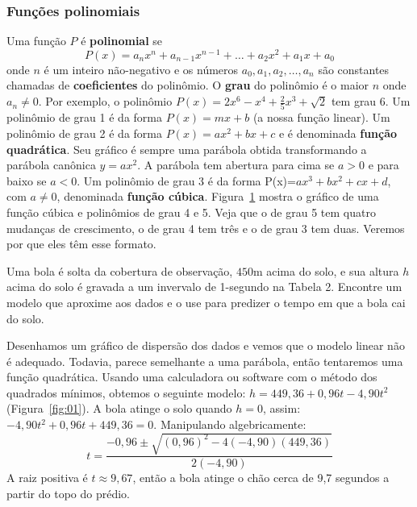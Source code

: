 \subsubsection{Funções polinomiais}
Uma função $P$ é \textbf{polinomial} se $$P(x)=a_nx^n+a_{n-1}x^{n-1}+\dots+a_2x^2+a_1x+a_0$$
onde $n$ é um inteiro não-negativo e os números $a_0,a_1,a_2,\dots,a_n$ são constantes chamadas de \textbf{coeficientes} do polinômio. O \textbf{grau} do polinômio é o maior $n$ onde $a_n\neq 0$. Por exemplo, o polinômio $P(x)=2x^6-x^4+\frac{2}{5}x^3+\sqrt{2}$ tem grau 6. Um polinômio de grau 1 é da forma $P(x)=mx+b$ (a nossa função linear). Um polinômio de grau 2 é da forma $P(x)=ax^2+bx+c$ e é denominada \textbf{função quadrática}. Seu gráfico é sempre uma parábola obtida transformando a parábola canônica $y=ax^2$. A parábola tem abertura para cima se $a>0$ e para baixo se $a<0$. Um polinômio de grau 3 é da forma P(x)=$ax^3+bx^2+cx+d$, com $a\neq 0$, denominada \textbf{função cúbica}. Figura~\ref{fig:polinomiais} mostra o gráfico de uma função cúbica e polinômios de grau 4 e 5. Veja que o de grau 5 tem quatro mudanças de crescimento, o de grau 4 tem três e o de grau 3 tem duas. Veremos por que eles têm esse formato.
\vspace{-0.5cm}\begin{figure}[!ht]
  \centering
  \caption{}\label{fig:polinomiais}
\end{figure}\vspace{-0.5cm}

 Uma bola é solta da cobertura de observação, $450\si\meter$ acima do solo, e sua altura $h$ acima do solo é gravada a um invervalo de 1-segundo na Tabela 2. Encontre um modelo que aproxime aos dados e o use para predizer o tempo em que a bola cai do solo.

\solution Desenhamos um gráfico de dispersão dos dados e vemos que o modelo linear não é adequado. Todavia, parece semelhante a uma parábola, então tentaremos uma função quadrática. Usando uma calculadora ou software com o método dos quadrados mínimos, obtemos o seguinte modelo: $h=449,36+0,96t-4,90t^2$ (Figura~\ref{fig:01}). A bola atinge o solo quando $h=0$, assim: $-4,90t^2+0,96t+449,36 = 0$. Manipulando algebricamente: $$t=\frac{-0,96\pm \sqrt{(0,96)^2-4(-4,90)(449,36)}}{2(-4,90)}$$
A raiz positiva é $t\approx 9,67$, então a bola atinge o chão cerca de 9,7 segundos a partir do topo do prédio.

